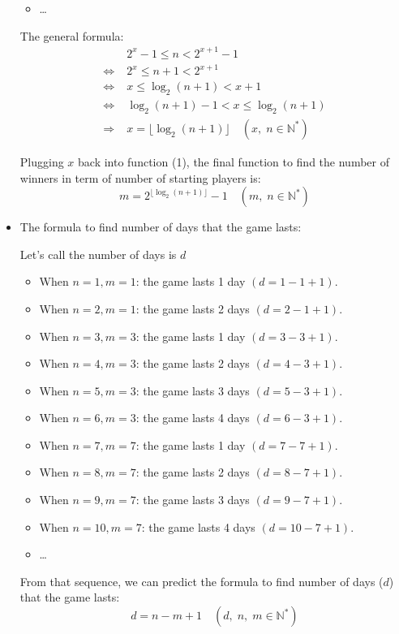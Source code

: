 \documentclass[12pt]{article}
\begin{document}
\begin{itemize}
\begin{itemize}
    \item \dots \par
\end{itemize}


The general formula: 
\begin{align*}
    &2^x-1\leqslant n<2^{x+1}-1 \\
    \Longleftrightarrow\; &
    2^x\leqslant n+1 <2^{x+1} \\
    \Longleftrightarrow\; &
    x\leqslant \log_2 \left(n+1\right) <x+1 \\
    \Longleftrightarrow\; &
    \log_2 \left(n+1\right)-1 <x \leqslant \log_2 \left(n+1\right) \\
    \Longrightarrow\; & x = \lfloor\log_2\left(n+1\right)\rfloor \quad\left(x,\; n\in \mathbb{N^*} \right)
\end{align*}

Plugging $x$ back into function (1), the final function to find the number of winners in term of number of starting players is: $$m=2^{ \lfloor\log_2 \left(n+1 \right) \rfloor} -1 \quad \left(m,\; n\in \mathbb{N^*} \right)$$ \par



    \item The formula to find number of days that the game lasts:\par
Let's call the number of days is $d$\par
\begin{itemize}
    \item When $n=1, m=1$: the game lasts 1 day $\left(d=1-1+1\right)$.
    \item When $n=2, m=1$: the game lasts 2 days $\left(d=2-1+1\right)$.
    \item When $n=3, m=3$: the game lasts 1 day $\left(d=3-3+1\right)$.
    \item When $n=4, m=3$: the game lasts 2 days $\left(d=4-3+1\right)$.
    \item When $n=5, m=3$: the game lasts 3 days $\left(d=5-3+1\right)$.
    \item When $n=6, m=3$: the game lasts 4 days $\left(d=6-3+1\right)$.
    \item When $n=7, m=7$: the game lasts 1 day $\left(d=7-7+1\right)$.
    \item When $n=8, m=7$: the game lasts 2 days $\left(d=8-7+1\right)$.
    \item When $n=9, m=7$: the game lasts 3 days $\left(d=9-7+1\right)$.
    \item When $n=10, m=7$: the game lasts 4 days $\left(d=10-7+1\right)$.
    \item \dots
\end{itemize}

From that sequence, we can predict the formula to find number of days ($d$) that the game lasts:
$$d=n-m+1\quad \left(d,\;n,\; m\in \mathbb{N^*} \right)$$

\end{itemize}
\par
\end{document}
